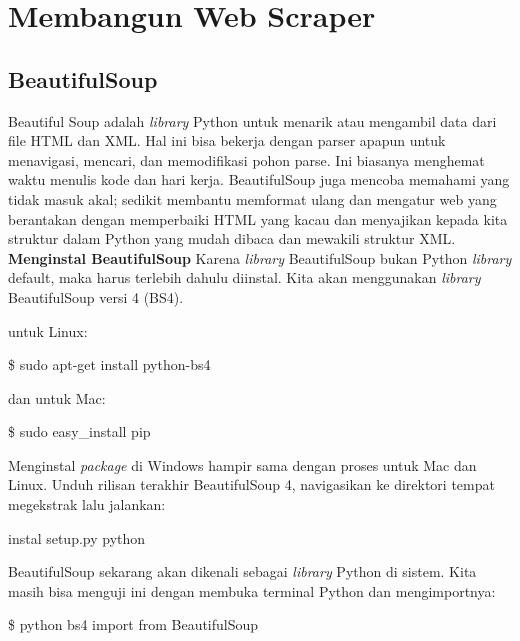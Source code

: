 \section{Membangun Web Scraper}
\subsection{BeautifulSoup}
\par Beautiful Soup adalah \textit{library} Python untuk menarik atau mengambil data dari file HTML dan XML. Hal ini bisa bekerja dengan parser apapun untuk menavigasi, mencari, dan memodifikasi pohon parse. Ini biasanya menghemat waktu menulis kode dan hari kerja. BeautifulSoup juga mencoba memahami yang tidak masuk akal; sedikit membantu memformat ulang dan mengatur web yang berantakan dengan memperbaiki HTML yang kacau dan menyajikan kepada kita struktur dalam Python yang mudah dibaca dan mewakili struktur XML.
\textbf{Menginstal BeautifulSoup}
Karena \textit{library} BeautifulSoup bukan Python \textit{library} default, maka harus terlebih dahulu diinstal. Kita akan menggunakan \textit{library} BeautifulSoup versi 4 (BS4).

untuk Linux:

\$ sudo apt-get install python-bs4

dan untuk Mac:

\$ sudo easy\_install pip

Menginstal \textit{package} di Windows hampir sama dengan proses untuk Mac dan Linux. Unduh rilisan terakhir BeautifulSoup 4, navigasikan ke direktori tempat megekstrak lalu jalankan:

instal setup.py python

BeautifulSoup sekarang akan dikenali sebagai \textit{library} Python di sistem. Kita masih bisa menguji ini dengan membuka terminal Python dan mengimportnya:

\begin{algorithm}

\$ python
bs4 import from BeautifulSoup
\end{algorithm}
